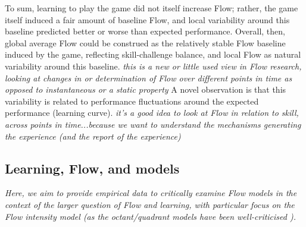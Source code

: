 \documentclass[fleqn,10pt]{wlscirep}
\begin{document}
To sum, learning to play the game did not itself increase Flow; rather, the game itself induced a fair amount of baseline Flow, and local variability around this baseline predicted better or worse than expected performance. Overall, then, global average Flow could be construed as the relatively stable Flow baseline induced by the game, reflecting skill-challenge balance, and local Flow as natural variability around this baseline.
\textit{this is a new or little used view in Flow research, looking at changes in or determination of Flow over different points in time as opposed to instantaneous or a static property}
A novel observation is that this variability is related to performance fluctuations around the expected performance (learning curve).
\textit{it's a good idea to look at Flow in relation to skill, across points in time...because we want to understand the mechanisms generating the experience (and the report of the experience)}



\subsection*{Learning, Flow, and models}

\textit{Here, we aim to provide empirical data to critically examine Flow models in the context of the larger question of Flow and learning, with particular focus on the Flow intensity model \cite{Keller2012} (as the octant/quadrant models have been well-criticised \cite{Moneta2012}).}
\end{document}
